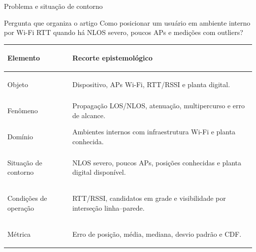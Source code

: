 \documentclass[aspectratio=169,11pt]{beamer}
\begin{document}
\begin{frame}{Problema e situação de contorno}
  \footnotesize
  \vspace{-0.18cm}
  \begin{block}{Pergunta que organiza o artigo}
    Como posicionar um usuário em ambiente interno por Wi-Fi RTT quando há NLOS severo, poucos APs e medições com outliers?
  \end{block}

  \vspace{0.24cm}
  \setlength{\tabcolsep}{3pt}
  \renewcommand{\arraystretch}{0.92}
  \begin{tabular}{>{\bfseries\raggedright\arraybackslash}p{}>{\raggedright\arraybackslash}p{}}
    \toprule
    Elemento & Recorte epistemológico \\
    \midrule
    Objeto & Dispositivo, APs Wi-Fi, RTT/RSSI e planta digital. \\
    Fenômeno & Propagação LOS/NLOS, atenuação, multipercurso e erro de alcance. \\
    Domínio & Ambientes internos com infraestrutura Wi-Fi e planta conhecida. \\
    Situação de contorno & NLOS severo, poucos APs, posições conhecidas e planta digital disponível. \\
    Condições de operação & RTT/RSSI, candidatos em grade e visibilidade por interseção linha--parede. \\
    Métrica & Erro de posição, média, mediana, desvio padrão e CDF. \\
    \bottomrule
  \end{tabular}

\end{frame}
\end{document}

